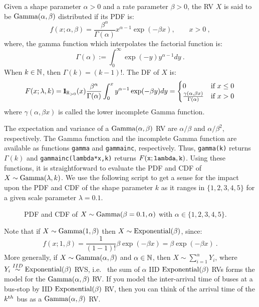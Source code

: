 \begin{model}
Given a shape parameter $\alpha>0$ and a rate parameter $\beta>0$, the RV $X$ is said to be $\mbox{{\rm Gamma}}(\alpha,\beta)$ distributed if its PDF is:
\[
f(x;\alpha,\beta) = \frac{\beta^{\alpha}}{\Gamma(\alpha)} x^{\alpha-1} \exp(-\beta x), \qquad x > 0 \ ,
\]
where, the gamma function which interpolates the factorial function is:
\[
\Gamma(\alpha) := \int_0^{\infty} \exp(-y) y^{\alpha-1} dy \ .
\]
When $k \in \mathbb{N}$, then $\Gamma(k)=(k-1)!$.  The DF of $X$ is:
\[
F(x;\lambda,k) = {1}\mspace{-11 mu}{1}_{\mathbb{R}_{>0}}(x) \frac{\beta^{\alpha}}{\Gamma(\alpha)} \int_0^{x} y^{\alpha-1} \exp(-\beta y) dy =
\begin{cases}
0 & \text{if } x \leq 0 \\
 \frac{\gamma(\alpha,\beta x)}{\Gamma(\alpha)} & \text{if } x > 0
\end{cases}
\]
where $\gamma(\alpha,\beta x)$ is called the lower incomplete Gamma function.
\end{model}
The expectation and variance of a $\mbox{{\rm Gamma}}(\alpha,\beta)$ RV are $\alpha/\beta$ and $\alpha/\beta^2$, respectively.
The Gamma function and the incomplete Gamma function are available as \Matlab functions {\tt gamma} and {\tt gammainc}, respectively.  Thus, {\tt gamma(k)} returns $\Gamma(k)$ and {\tt gammainc(lambda*x,k)} returns $F({\tt x};{\tt lambda},{\tt k})$.  Using these functions, it is straightforward to evaluate the PDF and CDF of $X \sim \mbox{{\rm Gamma}}(\lambda,k)$.  We use the following script to get a sense for the impact upon the PDF and CDF of the shape parameter $k$ as it ranges in $\{1,2,3,4,5\}$ for a given scale parameter $\lambda=0.1$.

\begin{figure}[htpb]
\caption{PDF and CDF of $X \sim \mbox{{\rm Gamma}}(\beta=0.1,\alpha)$ with $\alpha \in \{1,2,3,4,5\}$.\label{F:PlotPdfCdfGamma}}
\centering   {}
\end{figure}


Note that if $X \sim \mbox{{\rm Gamma}}(1,\beta)$ then $X \sim \mbox{{\rm Exponential}}(\beta)$, since:
\[
f(x;1,\beta)  
= \frac{1}{(1-1)!}  \beta \exp(-\beta x) = \beta \exp(-\beta x) \ .
\]
More generally, if $X \sim \mbox{{\rm Gamma}}(\alpha,\beta)$ and $\alpha \in \mathbb{N}$, then $X \sim \sum_{i=1}^{\alpha} Y_i$, where $Y_i \overset{IID}{\sim} \mbox{{\rm Exponential}}(\beta)$ RVS, i.e.~ the sum of $\alpha$ IID $\mbox{{\rm Exponential}}(\beta)$ RVs forms the model for the $\mbox{{\rm Gamma}}(\alpha,\beta)$ RV.  If you model the inter-arrival time of buses at a bus-stop by IID $\mbox{{\rm Exponential}}(\beta)$ RV, then you can think of the arrival time of the $k^{\text th}$ bus as a $\mbox{{\rm Gamma}}(\alpha,\beta)$ RV.


